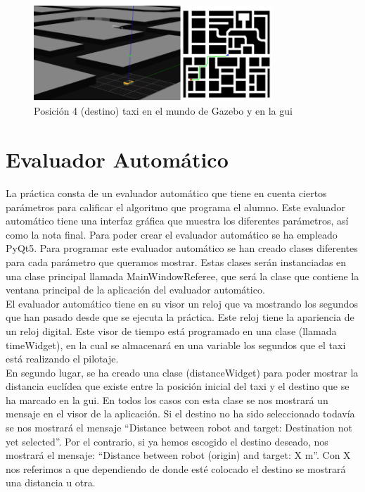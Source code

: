 \begin{figure}[H]
  \begin{center}
    \includegraphics[width=0.8\textwidth]{figures/GPP/camino1_G.png}
		\caption{Posición 4 (destino) taxi en el mundo de Gazebo y en la \acrshort{gui}}
		\label{fig.camino1_G_gpp}
		\end{center}
\end{figure}

\section{Evaluador Automático}
La práctica consta de un evaluador automático que tiene en cuenta ciertos parámetros para calificar el algoritmo que programa el alumno. Este evaluador automático tiene una interfaz gráfica que muestra los diferentes parámetros, así como la nota final. Para poder crear el evaluador automático se ha empleado PyQt5. Para programar este evaluador automático se han creado clases diferentes para cada parámetro que queramos mostrar. Estas clases serán instanciadas en una clase principal llamada MainWindowReferee, que será la clase que contiene la ventana principal de la aplicación del evaluador automático.\\

El evaluador automático tiene en su visor un reloj que va mostrando los segundos que han pasado desde que se ejecuta la práctica. Este reloj tiene la apariencia de un reloj digital. Este visor de tiempo está programado en una clase (llamada timeWidget), en la cual se almacenará en una variable los segundos que el taxi está realizando el pilotaje.\\

En segundo lugar, se ha creado una clase (distanceWidget) para poder mostrar la distancia euclídea que existe entre la posición inicial del taxi y el destino que se ha marcado en la \acrshort{gui}. En todos los casos con esta clase se nos mostrará un mensaje en el visor de la aplicación. Si el destino no ha sido seleccionado todavía se nos mostrará el mensaje “Distance between robot and target: Destination not yet selected''. Por el contrario, si ya hemos escogido el destino deseado, nos mostrará el mensaje: ``Distance between robot (origin) and target: X m”. Con X nos referimos a que dependiendo de donde esté colocado el destino se mostrará una distancia u otra.\\

